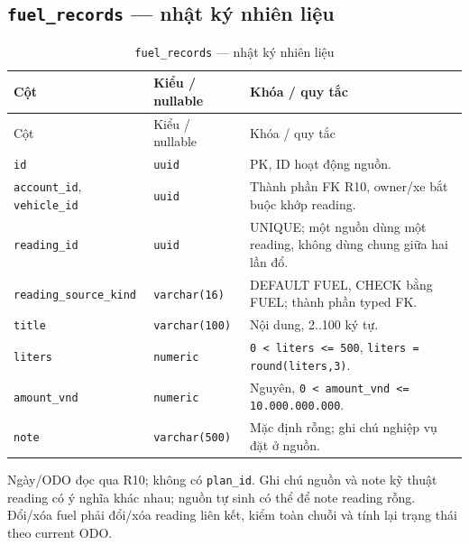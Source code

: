 \subsection{\texttt{fuel\_\allowbreak{}records} — nhật ký nhiên liệu}
\begin{smalltable}\begin{longtable}{L{3.0cm}L{3.2cm}L{8.2cm}}
\caption{\texttt{fuel\_\allowbreak{}records} — nhật ký nhiên liệu}\label{tab:dictionary-8}\\\toprule
Cột & Kiểu / nullable & Khóa / quy tắc\\\midrule\endfirsthead
\toprule Cột & Kiểu / nullable & Khóa / quy tắc\\\midrule\endhead
\texttt{id} & \texttt{uuid} & PK, ID hoạt động nguồn.\\
\texttt{account\_\allowbreak{}id}, \texttt{vehicle\_\allowbreak{}id} & \texttt{uuid} & Thành phần FK R10, owner/xe bắt buộc khớp reading.\\
\texttt{reading\_\allowbreak{}id} & \texttt{uuid} & UNIQUE; một nguồn dùng một reading, không dùng chung giữa hai lần đổ.\\
\texttt{reading\_\allowbreak{}source\_\allowbreak{}kind} & \texttt{varchar(16)} & DEFAULT FUEL, CHECK bằng FUEL; thành phần typed FK.\\
\texttt{title} & \texttt{varchar(100)} & Nội dung, 2..100 ký tự.\\
\texttt{liters} & \texttt{numeric} & \texttt{0 < liters <= 500}, \texttt{liters = round(liters,\allowbreak{}3)}.\\
\texttt{amount\_\allowbreak{}vnd} & \texttt{numeric} & Nguyên, \texttt{0 < amount\_\allowbreak{}vnd <= 10.000.000.000}.\\
\texttt{note} & \texttt{varchar(500)} & Mặc định rỗng; ghi chú nghiệp vụ đặt ở nguồn.\\
\bottomrule\end{longtable}\end{smalltable}
Ngày/ODO đọc qua R10; không có \texttt{plan\_\allowbreak{}id}. Ghi chú nguồn và note kỹ thuật reading có ý nghĩa khác nhau; nguồn tự sinh có thể để note reading rỗng. Đổi/xóa fuel phải đổi/xóa reading liên kết, kiểm toàn chuỗi và tính lại trạng thái theo current ODO.\par
